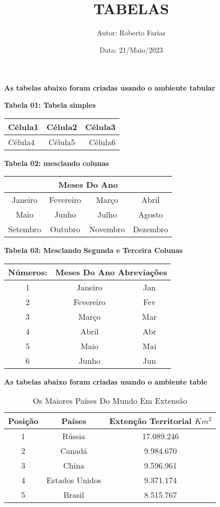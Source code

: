 \documentclass[a4paper,12pt]{article}
\title{\textbf{TABELAS}}
\author{Autor: Roberto Farias}
\date{Data: 21/Maio/2023}
\begin{document}
\maketitle %

\textbf{As tabelas abaixo foram criadas usando o ambiente tabular}
\vspace{1cm}

\noindent
\textbf{Tabela 01: Tabela simples}\\
\begin{tabular}{|l|c|r|} \hline
	Célula1 & Célula2 & Célula3\\ \hline
	Célula4 & Célula5 & Célula6\\ \hline
\end{tabular}

\vspace{1cm}

\noindent
\textbf{Tabela 02: mesclando colunas}\\
\begin{tabular}{|c|c|c|c|} \hline
	\multicolumn{4}{|c|}{Meses Do Ano}\\ \hline
	Janeiro & Fevereiro & Março & Abril \\ \hline
	Maio & Junho & Julho & Agosto \\ \hline
	Setembro & Outubro & Novembro & Dezembro \\ \hline
\end{tabular}

\vspace{1cm}

\noindent
\textbf{Tabela 03: Mesclando Segunda e Terceira Colunas}\\
\begin{tabular}{|c|cc|}\hline
Números: & \multicolumn{2}{c|}{Meses Do Ano Abreviações}\\ \hline
1 & Janeiro & Jan \\ \cline{2-3}
2 & Fevereiro & Fev \\ \cline{2-3}
3 & Março & Mar \\ \cline{2-3}
4 & Abril & Abr \\ \cline{2-3}
5 & Maio & Mai \\ \cline{2-3}
6 & Junho & Jun \\ \hline
\end{tabular}

\vspace{1cm}
\textbf{As tabelas abaixo foram criadas usando o ambiente table}
\begin{table}[h]
\centering
\caption{Os Maiores Países Do Mundo Em Extensão}
\vspace{0.5cm}
	\begin{tabular}{c|cc}
		Posição & Países & Extenção Territorial $Km^2$\\ \hline
		1 & Rússia & 17.089.246\\
		2 & Canadá & 9.984.670\\
		3 & China & 9.596.961\\
		4 & Estados Unidos & 9.371.174\\
		5 & Brasil & 8.515.767
	\end{tabular}
\end{table}
\end{document}
